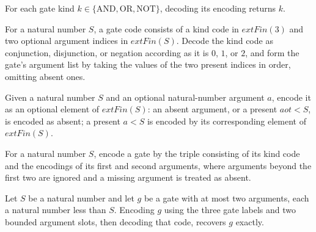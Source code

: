 \begin{theorem}
\label{BoolCircuit.decodeKind_encodeKind}
\leanok
{}
For each gate kind $k \in \{\mathrm{AND},\mathrm{OR},\mathrm{NOT}\}$, decoding its
encoding returns $k$.
\end{theorem}

\begin{definition}
\label{BoolCircuit.decodeGate}
\leanok
{}
For a natural number $S$, a gate code consists of a kind code in $	ext{Fin}(3)$ and two
optional argument indices in $	ext{Fin}(S)$. Decode the kind code as conjunction,
disjunction, or negation according as it is $0$, $1$, or $2$, and form the gate's
argument list by taking the values of the two present indices in order, omitting absent
ones.
\end{definition}

\begin{definition}
\label{BoolCircuit.encodeArg}
\leanok
Given a natural number $S$ and an optional natural-number argument $a$, encode it as an
optional element of $	ext{Fin}(S)$: an absent argument, or a present $a
ot< S$, is encoded as absent; a present $a<S$ is encoded by its corresponding element of
$	ext{Fin}(S)$.
\end{definition}

\begin{definition}
\label{BoolCircuit.encodeGate}
\leanok
{}
For a natural number $S$, encode a gate by the triple consisting of its kind code and
the encodings of its first and second arguments, where arguments beyond the first two
are ignored and a missing argument is treated as absent.
\end{definition}

\begin{theorem}
\label{BoolCircuit.decodeGate_encodeGate}
\leanok
{}
Let $S$ be a natural number and let $g$ be a gate with at most two arguments, each a
natural number less than $S$. Encoding $g$ using the three gate labels and two bounded
argument slots, then decoding that code, recovers $g$ exactly.
\end{theorem}


